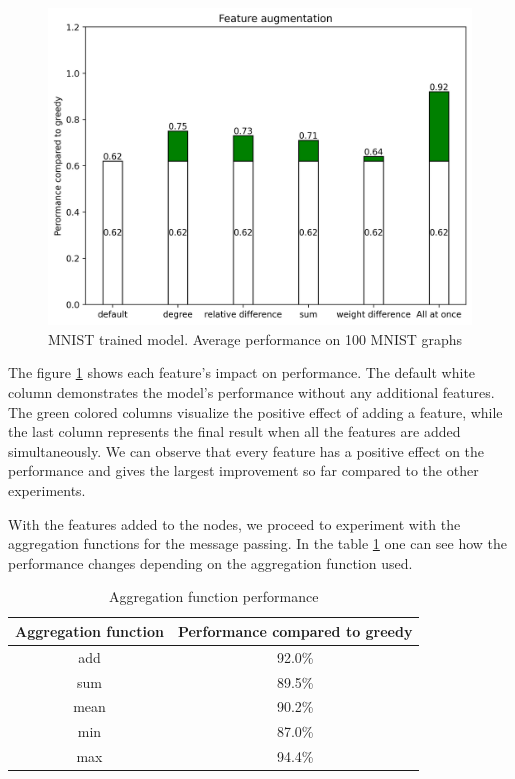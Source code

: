 \begin{figure}[H]
    \centering
    \hspace*{-1.5cm}
    \includegraphics[scale=0.8]{figures/FeatureAugmentationLine}
    \caption{MNIST trained model. Average performance on 100 MNIST graphs}
    \label{Feature Augmentation Effect}
\end{figure}

The figure \ref{Feature Augmentation Effect} shows each feature's impact on performance. The default white column demonstrates the model's performance without any additional features. The green colored columns visualize the positive effect of adding a feature, while the last column represents the final result when all the features are added simultaneously. We can observe that every feature has a positive effect on the performance and gives the largest improvement so far compared to the other experiments.

With the features added to the nodes, we proceed to experiment with the aggregation functions for the message passing. In the table \ref{aggrtable} one can see how the performance changes depending on the aggregation function used.

\begin{table}[h!]
\centering
\begin{tabular}{|| c | c ||} 
 \hline
 Aggregation function & Performance compared to greedy \\ [0.5ex] 
 \hline\hline
 add & 92.0\% \\
 \hline
 sum & 89.5\% \\
 \hline
 mean & 90.2\% \\
 \hline
 min & 87.0\% \\
 \hline
 max & 94.4\% \\
 \hline
\end{tabular}
\caption{Aggregation function performance}
\label{aggrtable}
\end{table}

